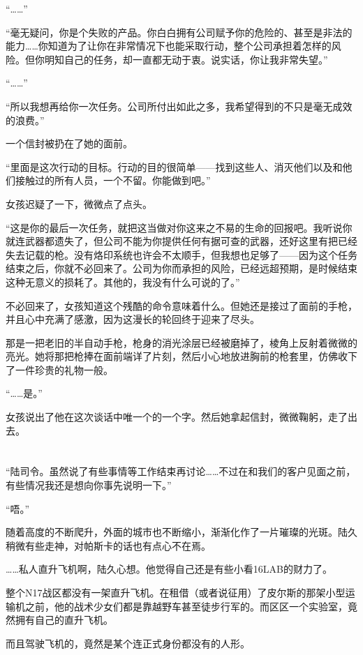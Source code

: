 “……”

“毫无疑问，你是个失败的产品。你白白拥有公司赋予你的危险的、甚至是非法的能力……你知道为了让你在非常情况下也能采取行动，整个公司承担着怎样的风险。但你明知自己的任务，却一直都无动于衷。说实话，你让我非常失望。”

“……”

“所以我想再给你一次任务。公司所付出如此之多，我希望得到的不只是毫无成效的浪费。”

一个信封被扔在了她的面前。

“里面是这次行动的目标。行动的目的很简单——找到这些人、消灭他们以及和他们接触过的所有人员，一个不留。你能做到吧。”

女孩迟疑了一下，微微点了点头。

“这是你的最后一次任务，就把这当做对你这来之不易的生命的回报吧。我听说你就连武器都遗失了，但公司不能为你提供任何有据可查的武器，还好这里有把已经失去记载的枪。没有烙印系统也许会不太顺手，但我想也足够了——因为这个任务结束之后，你就不必回来了。公司为你而承担的风险，已经远超预期，是时候结束这种无意义的损耗了。其他的，我没有什么可说的了。”

不必回来了，女孩知道这个残酷的命令意味着什么。但她还是接过了面前的手枪，并且心中充满了感激，因为这漫长的轮回终于迎来了尽头。

那是一把老旧的半自动手枪，枪身的消光涂层已经被磨掉了，棱角上反射着微微的亮光。她将那把枪捧在面前端详了片刻，然后小心地放进胸前的枪套里，仿佛收下了一件珍贵的礼物一般。

“……是。”

女孩说出了他在这次谈话中唯一个的一个字。然后她拿起信封，微微鞠躬，走了出去。

\section*{}

“陆司令。虽然说了有些事情等工作结束再讨论……不过在和我们的客户见面之前，有些情况我还是想向你事先说明一下。”

“唔。”

随着高度的不断爬升，外面的城市也不断缩小，渐渐化作了一片璀璨的光斑。陆久稍微有些走神，对帕斯卡的话也有点心不在焉。

……私人直升飞机啊，陆久心想。他觉得自己还是有些小看16LAB的财力了。

整个N17战区都没有一架直升飞机。在租借（或者说征用）了皮尔斯的那架小型运输机之前，他的战术少女们都是靠越野车甚至徒步行军的。而区区一个实验室，竟然拥有自己的直升飞机。

而且驾驶飞机的，竟然是某个连正式身份都没有的人形。

